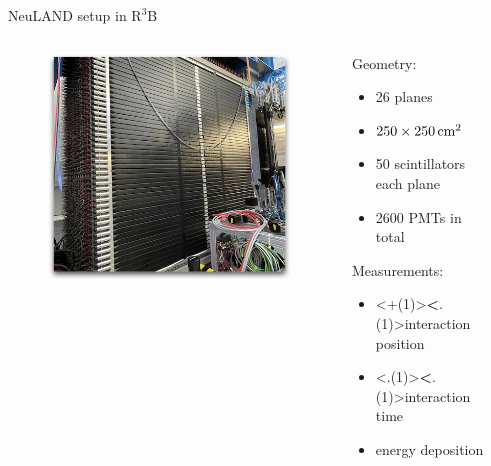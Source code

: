 \documentclass[compress, 13pt, aspectratio=169]{beamer}
\begin{document}
{\begin{frame}{NeuLAND setup in $\text{R}^3\text{B}$}
	\begin{columns}[c]
		\begin{column}{0.4\textwidth}
			\pause
			\begin{figure}
				\includegraphics[width = \textwidth]{neulandReal}
			\end{figure}
		\end{column}
		\hspace*{0.5cm}
		\begin{column}{0.3\textwidth}
			\begin{exampleblock}{}
				Geometry:\\
				\begin{itemize}
					\item 26 planes
					\item $\qtyproduct[product-units=power]{250 x 250}{\centi\meter}$
					\item 50 scintillators each plane
					\item 2600 PMTs in total
				\end{itemize}
				\pause
				Measurements:\\
				\begin{itemize}
					\item \alert<+(1)>{\textbf<.(1)>{interaction position}}
					\item \alert<.(1)>{\textbf<.(1)>{interaction time}}
					\item energy deposition
				\end{itemize}
			\end{exampleblock}
		\end{column}
		\begin{column}{0.3\textwidth}
		\end{column}

	\end{columns}
	\let\thefootnote\relax{}
\end{frame}
}
\end{document}
